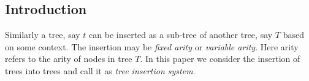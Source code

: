 

\subsection{Introduction}
   
    Similarly a tree, say $t$ can be inserted as a sub-tree of another tree, say  $T$ based on some context.
    The insertion may be \emph{fixed arity} or \emph{variable arity}. Here arity refers to the arity of nodes in tree $T$.
In this paper we consider the insertion of trees into trees and call it as \emph{tree insertion system}.

